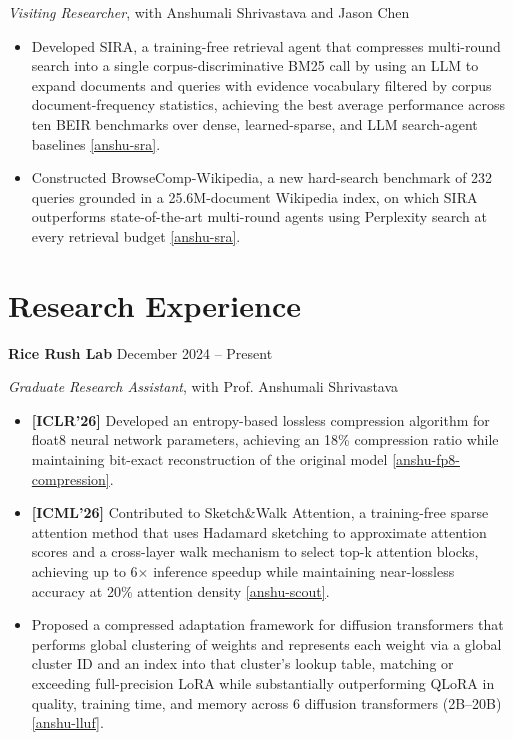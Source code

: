 \documentclass[11pt]{article}
\newcommand{\venue}[1]{[\textsc{#1}]}
\newcommand{\topvenuetag}[1]{{\color{BrickRed}\textbf{[\textsc{#1}]}}}
\begin{document}
\textit{Visiting Researcher}, with Anshumali Shrivastava and Jason Chen

\begin{itemize}
    \item \venue{arXiv'26} Developed SIRA, a training-free retrieval agent that compresses multi-round search into a single corpus-discriminative BM25 call by using an LLM to expand documents and queries with evidence vocabulary filtered by corpus document-frequency statistics, achieving the best average performance across ten BEIR benchmarks over dense, learned-sparse, and LLM search-agent baselines \ref{anshu-sra}.
    \item \venue{arXiv'26} Constructed BrowseComp-Wikipedia, a new hard-search benchmark of 232 queries grounded in a 25.6M-document Wikipedia index, on which SIRA outperforms state-of-the-art multi-round agents using Perplexity search at every retrieval budget \ref{anshu-sra}.
\end{itemize}

\vspace{\lineskip}

\section*{Research Experience}

\textbf{Rice Rush Lab} \hfill December 2024 -- Present

\textit{Graduate Research Assistant}, with Prof. Anshumali Shrivastava

\begin{itemize}
    \item \topvenuetag{ICLR'26} Developed an entropy-based lossless compression algorithm for float8 neural network parameters, achieving an 18\% compression ratio while maintaining bit-exact reconstruction of the original model \ref{anshu-fp8-compression}.
    \item \topvenuetag{ICML'26} Contributed to Sketch\&Walk Attention, a training-free sparse attention method that uses Hadamard sketching to approximate attention scores and a cross-layer walk mechanism to select top-k attention blocks, achieving up to 6$\times$ inference speedup while maintaining near-lossless accuracy at 20\% attention density \ref{anshu-scout}.
    \item Proposed a compressed adaptation framework for diffusion transformers that performs global clustering of weights and represents each weight via a global cluster ID and an index into that cluster's lookup table, matching or exceeding full-precision LoRA while substantially outperforming QLoRA in quality, training time, and memory across 6 diffusion transformers (2B--20B) \ref{anshu-lluf}.
\end{itemize}
\end{document}
